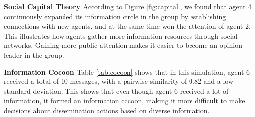 \noindent \textbf{Social Capital Theory \cite{b62}} \quad According to Figure \ref{fig:capital}, we found that agent 4 continuously expanded its information circle in the group by establishing connections with new agents, and at the same time won the attention of agent 2. 
This illustrates how agents gather more information resources through social networks.
Gaining more public attention makes it easier to become an opinion leader in the group.



\noindent \textbf{Information Cocoon \cite{b63}} \quad Table \ref{tab:cocoon} shows that in this simulation, agent 6 received a total of 10 messages, with a pairwise similarity of 0.82 and a low standard deviation. 
This shows that even though agent 6 received a lot of information, it formed an information cocoon, making it more difficult to make decisions about dissemination actions based on diverse information.


